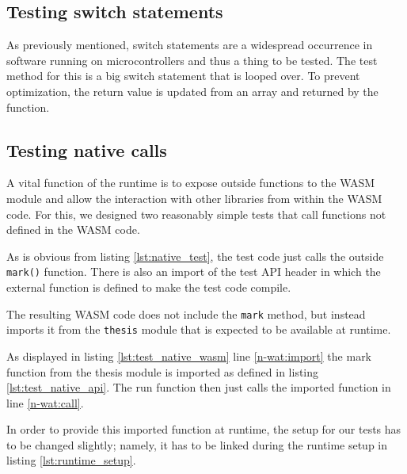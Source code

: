 \subsection{Testing switch statements}



As previously mentioned, switch statements are a widespread occurrence in software running on microcontrollers and thus a thing to be tested. The test method for this is a big switch statement that is looped over. To prevent optimization, the return value is updated from an array and returned by the function.

\subsection{Testing native calls}\label{subsec:native}

A vital function of the runtime is to expose outside functions to the WASM module and allow the interaction with other libraries from within the WASM code. For this, we designed two reasonably simple tests that call functions not defined in the WASM code.



As is obvious from listing \ref{lst:native_test}, the test code just calls the outside \lstinline{mark()} function. There is also an import of the test API header in which the external function is defined to make the test code compile.



The resulting WASM code does not include the \lstinline{mark} method, but instead imports it from the \lstinline{thesis} module that is expected to be available at runtime.



As displayed in listing \ref{lst:test_native_wasm} line \ref{n-wat:import} the mark function from the thesis module is imported as defined in listing \ref{lst:test_native_api}. The run function then just calls the imported function in line \ref{n-wat:call}.

In order to provide this imported function at runtime, the setup for our tests has to be changed slightly; namely, it has to be linked during the runtime setup in listing \ref{lst:runtime_setup}.

